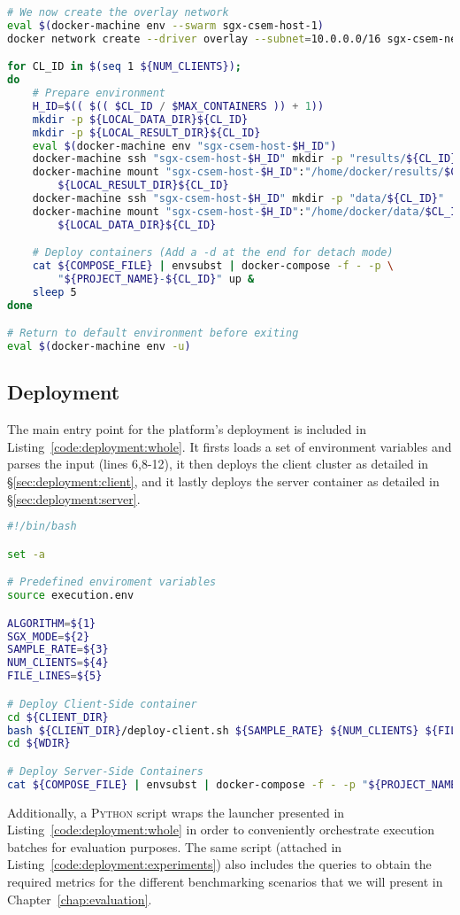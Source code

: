 \begin{lstlisting}[language=sh,caption={Client Cluster Deployment Script.},label=code:deploy-client]
# We now create the overlay network
eval $(docker-machine env --swarm sgx-csem-host-1)
docker network create --driver overlay --subnet=10.0.0.0/16 sgx-csem-net

for CL_ID in $(seq 1 ${NUM_CLIENTS});
do
    # Prepare environment
    H_ID=$(( $(( $CL_ID / $MAX_CONTAINERS )) + 1))
    mkdir -p ${LOCAL_DATA_DIR}${CL_ID}
    mkdir -p ${LOCAL_RESULT_DIR}${CL_ID}
    eval $(docker-machine env "sgx-csem-host-$H_ID")
    docker-machine ssh "sgx-csem-host-$H_ID" mkdir -p "results/${CL_ID}"
    docker-machine mount "sgx-csem-host-$H_ID":"/home/docker/results/$CL_ID" \
        ${LOCAL_RESULT_DIR}${CL_ID}
    docker-machine ssh "sgx-csem-host-$H_ID" mkdir -p "data/${CL_ID}"
    docker-machine mount "sgx-csem-host-$H_ID":"/home/docker/data/$CL_ID" \
        ${LOCAL_DATA_DIR}${CL_ID}

    # Deploy containers (Add a -d at the end for detach mode)
    cat ${COMPOSE_FILE} | envsubst | docker-compose -f - -p \
        "${PROJECT_NAME}-${CL_ID}" up &
    sleep 5
done

# Return to default environment before exiting
eval $(docker-machine env -u)
\end{lstlisting}

\subsection{Deployment} \label{sec:deployment:all}

The main entry point for the platform's deployment is included in Listing~\ref{code:deployment:whole}.
It firsts loads a set of environment variables and parses the input (lines 6,8-12), it then deploys the client cluster as detailed in \S\ref{sec:deployment:client}, and it lastly deploys the server container as detailed in \S\ref{sec:deployment:server}.
\begin{lstlisting}[language=sh,caption={Main entry point for a single execution.},label=code:deployment:whole]
#!/bin/bash

set -a

# Predefined enviroment variables
source execution.env

ALGORITHM=${1}
SGX_MODE=${2}
SAMPLE_RATE=${3}
NUM_CLIENTS=${4}
FILE_LINES=${5}

# Deploy Client-Side container
cd ${CLIENT_DIR}
bash ${CLIENT_DIR}/deploy-client.sh ${SAMPLE_RATE} ${NUM_CLIENTS} ${FILE_LINES}
cd ${WDIR}

# Deploy Server-Side Containers
cat ${COMPOSE_FILE} | envsubst | docker-compose -f - -p "${PROJECT_NAME}" up &
\end{lstlisting}

Additionally, a \textsc{Python} script wraps the launcher presented in Listing~\ref{code:deployment:whole} in order to conveniently orchestrate execution batches for evaluation purposes.
The same script (attached in Listing~\ref{code:deployment:experiments}) also includes the queries to obtain the required metrics for the different benchmarking scenarios that we will present in Chapter~\ref{chap:evaluation}.
